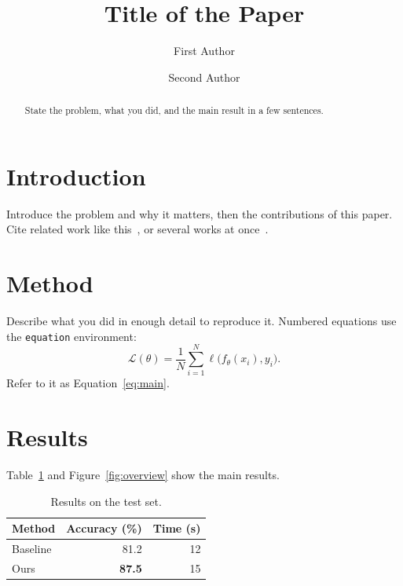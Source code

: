 \documentclass[sigplan,screen]{acmart}
\begin{document}
\title{Title of the Paper}

\author{First Author}

\author{Second Author}

\begin{abstract}
State the problem, what you did, and the main result in a few sentences.
\end{abstract}


\maketitle

\section{Introduction}
\label{sec:intro}
Introduce the problem and why it matters, then the contributions of this
paper. Cite related work like this~\cite{knuth1984}, or several works at
once~\cite{knuth1984,lamport1994}.

\section{Method}
\label{sec:method}
Describe what you did in enough detail to reproduce it. Numbered equations use
the \texttt{equation} environment:
\begin{equation}
  \label{eq:main}
  \mathcal{L}(\theta) = \frac{1}{N} \sum_{i=1}^{N} \ell\bigl(f_\theta(x_i), y_i\bigr).
\end{equation}
Refer to it as Equation~\eqref{eq:main}.

\section{Results}
\label{sec:results}
Table~\ref{tab:results} and Figure~\ref{fig:overview} show the main results.

\begin{table}[htbp]
  \centering
  \caption{Results on the test set.}
  \label{tab:results}
  \begin{tabular}{lrr}
    \toprule
    Method & Accuracy (\%) & Time (s) \\
    \midrule
    Baseline & 81.2 & 12 \\
    Ours & \textbf{87.5} & 15 \\
    \bottomrule
  \end{tabular}
\end{table}
\end{document}
